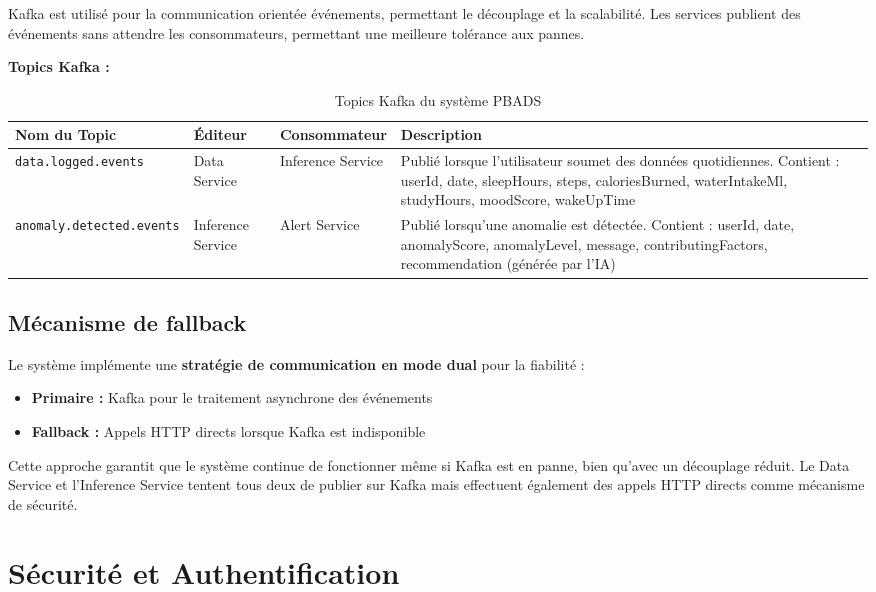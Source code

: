 Kafka est utilisé pour la communication orientée événements, permettant le découplage et la scalabilité. Les services publient des événements sans attendre les consommateurs, permettant une meilleure tolérance aux pannes.

\textbf{Topics Kafka :}

\begin{table}[H]
\centering
\small
\renewcommand{\arraystretch}{1.4}
\begin{tabular}{|p{4cm}|p{3cm}|p{3cm}|p{5cm}|}
\hline
\textbf{Nom du Topic} & \textbf{Éditeur} & \textbf{Consommateur} & \textbf{Description} \\
\hline
\texttt{data.logged.events} & Data Service & Inference Service & Publié lorsque l'utilisateur soumet des données quotidiennes. Contient : userId, date, sleepHours, steps, caloriesBurned, waterIntakeMl, studyHours, moodScore, wakeUpTime \\
\hline
\texttt{anomaly.detected.events} & Inference Service & Alert Service & Publié lorsqu'une anomalie est détectée. Contient : userId, date, anomalyScore, anomalyLevel, message, contributingFactors, recommendation (générée par l'IA) \\
\hline
\end{tabular}
\caption{Topics Kafka du système PBADS}
\label{tab:kafka_topics}
\end{table}

\subsection{Mécanisme de fallback}

Le système implémente une \textbf{stratégie de communication en mode dual} pour la fiabilité :
\begin{itemize}
    \item \textbf{Primaire :} Kafka pour le traitement asynchrone des événements
    \item \textbf{Fallback :} Appels HTTP directs lorsque Kafka est indisponible
\end{itemize}

Cette approche garantit que le système continue de fonctionner même si Kafka est en panne, bien qu'avec un découplage réduit. Le Data Service et l'Inference Service tentent tous deux de publier sur Kafka mais effectuent également des appels HTTP directs comme mécanisme de sécurité.

\section{Sécurité et Authentification}

